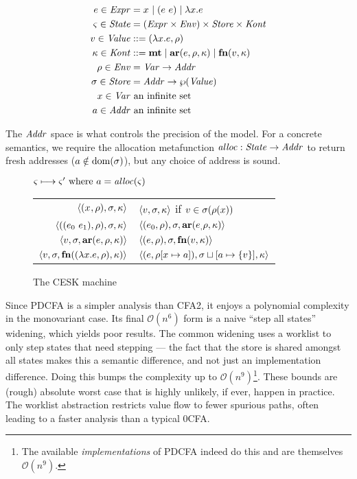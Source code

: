 \documentclass{llncs}
\begin{document}
\begin{align*}
  e \in \mathit{Expr} &= x^{{}} \mid (e\ e){} \mid \lambda{} x. e \\
  \varsigma \in \mathit{State} &= (\mathit{Expr} \times \mathit{Env}) \times \mathit{Store} \times \mathit{Kont} \\
  v \in \mathit{Value} &::= (\lambda{} x. e, \rho) \\
  \kappa \in \mathit{Kont} &::= \mathbf{mt} \mid \mathbf{ar}{}(e,\rho,\kappa) \mid \mathbf{fn}{}(v,\kappa) \\
  \rho \in \mathit{Env} &= \mathit{Var} \to \mathit{Addr} \\
  \sigma \in \mathit{Store} &= \mathit{Addr} \to \wp(\mathit{Value}) \\
  x \in \mathit{Var} &\text{ an infinite set} \\
  a \in \mathit{Addr} &\text{ an infinite set}
\end{align*}

The $\mathit{Addr}$ space is what controls the precision of the model. For a
concrete semantics, we require the allocation metafunction $\mathit{alloc} :
\mathit{State} \to \mathit{Addr}$ to return fresh addresses ($a \notin
\text{dom}(\sigma)$), but any choice of address is sound.

\begin{figure}
  \centering
  $\varsigma \longmapsto \varsigma' \text{ where } a = \mathit{alloc}(\varsigma)$ \\
  \begin{tabular}{r|l}
    \hline
    $\langle (x^{{}}, \rho), \sigma, \kappa \rangle$
    &
    $\langle v,\sigma,\kappa \rangle$ if $v \in \sigma(\rho(x))$
    \\
    $\langle ((e_{0}\ e_{1}){}, \rho), \sigma, \kappa \rangle$
    &
    $\langle (e_{0}, \rho), \sigma, \mathbf{ar}{}(e_{,}\rho,\kappa) \rangle$
    \\
    $\langle v, \sigma, \mathbf{ar}{}(e,\rho,\kappa) \rangle$
    &
    $\langle (e, \rho), \sigma, \mathbf{fn}{}(v, \kappa) \rangle$
    \\
    $\langle v,\sigma,\mathbf{fn}{}((\lambda{} x. e, \rho), \kappa) \rangle$
    &
    $\langle (e, \rho[x \mapsto a]), \sigma\sqcup[a \mapsto \{ v \}], \kappa \rangle$
  \end{tabular}
  \caption{The CESK machine}
  \label{fig:base-semantics}
\end{figure}

Since PDCFA is a simpler analysis than CFA2, it enjoys a polynomial
complexity in the monovariant case. Its final ${\mathcal O}(n^6)$ form
is a naive ``step all states'' widening, which yields poor
results. The common widening uses a worklist to only step states that
need stepping --- the fact that the store is shared amongst all states
makes this a semantic difference, and not just an implementation
difference. Doing this bumps the complexity up to ${\mathcal
  O}(n^9)$\footnote{The available \emph{implementations} of PDCFA
  indeed do this and are themselves ${\mathcal O}(n^9)$.}. These
bounds are (rough) absolute worst case that is highly unlikely, if
ever, happen in practice. The worklist abstraction restricts value
flow to fewer spurious paths, often leading to a faster analysis than
a typical 0CFA.
\end{document}
